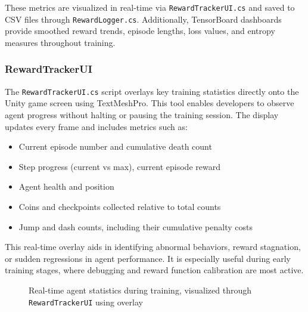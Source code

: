 \documentclass[12pt,oneside,openright,a4paper]{cpe-english-project}
\begin{document}
These metrics are visualized in real-time via \texttt{RewardTrackerUI.cs} and saved to CSV files through \texttt{RewardLogger.cs}. Additionally, TensorBoard dashboards provide smoothed reward trends, episode lengths, loss values, and entropy measures throughout training.

\subsubsection{RewardTrackerUI}

The \texttt{RewardTrackerUI.cs} script overlays key training statistics directly onto the Unity game screen using TextMeshPro. This tool enables developers to observe agent progress without halting or pausing the training session. The display updates every frame and includes metrics such as:

\begin{itemize}
\item Current episode number and cumulative death count
\item Step progress (current vs max), current episode reward
\item Agent health and position
\item Coins and checkpoints collected relative to total counts
\item Jump and dash counts, including their cumulative penalty costs
\end{itemize}

This real-time overlay aids in identifying abnormal behaviors, reward stagnation, or sudden regressions in agent performance. It is especially useful during early training stages, where debugging and reward function calibration are most active.

\begin{figure}[H]
\centering
{}
\caption{Real-time agent statistics during training, visualized through \texttt{RewardTrackerUI} using overlay}
\label{fig:RewardTrackerUIExample}
\end{figure}
\end{document}
